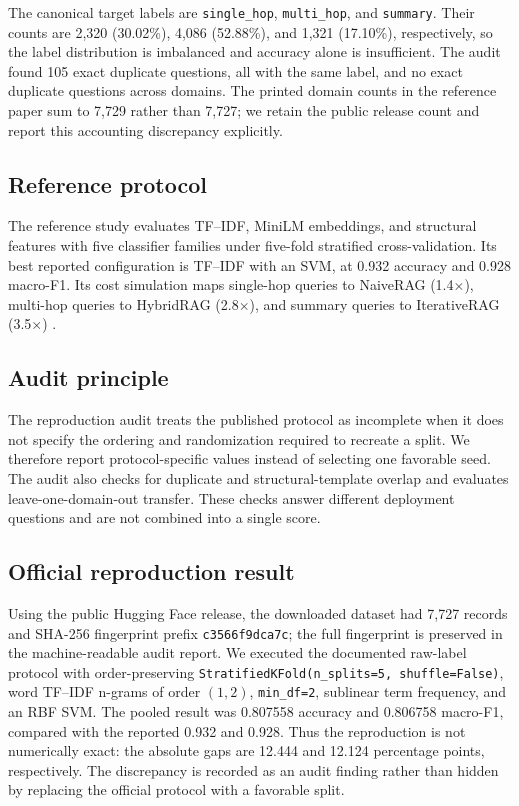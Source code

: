 \documentclass[conference]{IEEEtran}
\begin{document}
The canonical target labels are \texttt{single\_hop}, \texttt{multi\_hop}, and
\texttt{summary}. Their counts are 2,320 (30.02\%), 4,086 (52.88\%), and 1,321
(17.10\%), respectively, so the label distribution is imbalanced and accuracy
alone is insufficient. The audit found 105 exact duplicate questions, all with
the same label, and no exact duplicate questions across domains. The printed
domain counts in the reference paper sum to 7,729 rather than 7,727; we retain
the public release count and report this accounting discrepancy explicitly.

\subsection{Reference protocol}
The reference study evaluates TF--IDF, MiniLM embeddings, and structural features with five classifier families under five-fold stratified cross-validation. Its best reported configuration is TF--IDF with an SVM, at 0.932 accuracy and 0.928 macro-F1. Its cost simulation maps single-hop queries to NaiveRAG (1.4$\times$), multi-hop queries to HybridRAG (2.8$\times$), and summary queries to IterativeRAG (3.5$\times$) \cite{bansal2026}.

\subsection{Audit principle}
The reproduction audit treats the published protocol as incomplete when it does not specify the ordering and randomization required to recreate a split. We therefore report protocol-specific values instead of selecting one favorable seed. The audit also checks for duplicate and structural-template overlap and evaluates leave-one-domain-out transfer. These checks answer different deployment questions and are not combined into a single score.

\subsection{Official reproduction result}
Using the public Hugging Face release, the downloaded dataset had 7,727 records
and SHA-256 fingerprint prefix \texttt{c3566f9dca7c}; the full fingerprint is
preserved in the machine-readable audit report.
We executed the documented raw-label protocol with order-preserving \texttt{StratifiedKFold(n\_splits=5, shuffle=False)}, word TF--IDF n-grams of order $(1,2)$, \texttt{min\_df=2}, sublinear term frequency, and an RBF SVM. The pooled result was 0.807558 accuracy and 0.806758 macro-F1, compared with the reported 0.932 and 0.928. Thus the reproduction is not numerically exact: the absolute gaps are 12.444 and 12.124 percentage points, respectively. The discrepancy is recorded as an audit finding rather than hidden by replacing the official protocol with a favorable split.
\end{document}
